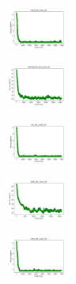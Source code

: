 \begin{figure}[H]
    \hfill
    \begin{subfigure}
        \centering
        \includegraphics[width=0.234\textwidth]{img/am01mej/rand_set_const_20_277451237_cost.png}
    \end{subfigure}
    \hfill
    \begin{subfigure}
        \centering
        \includegraphics[width=0.234\textwidth]{img/am01mej/newthyroid_set_const_20_277451237_cost.png}
    \end{subfigure}
    \hfill
    \begin{subfigure}
        \centering
        \includegraphics[width=0.234\textwidth]{img/am01mej/iris_set_const_20_49258669_cost.png}
    \end{subfigure}
    \hfill
    \begin{subfigure}
        \centering
        \includegraphics[width=0.234\textwidth]{img/am01mej/ecoli_set_const_20_49258669_cost.png}
    \end{subfigure}
    \hfill
    \begin{subfigure}
        \centering
        \includegraphics[width=0.234\textwidth]{img/am01mej/rand_set_const_20_49258669_cost.png}
    \end{subfigure}
    \hfill
    \begin{subfigure}

\end{subfigure}
\end{figure}
